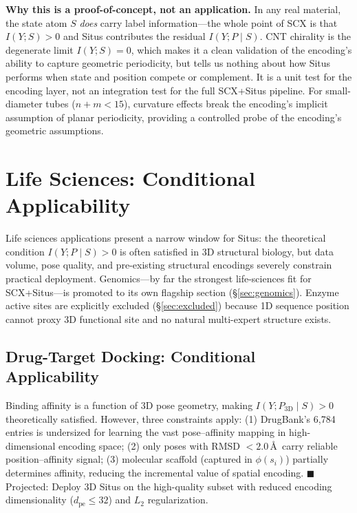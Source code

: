 \documentclass[12pt,a4paper]{article}
\begin{document}
\textbf{Why this is a proof-of-concept, not an application.} In any real material, the state atom $S$ \emph{does} carry label information---the whole point of SCX is that $I(Y;S) > 0$ and Situs contributes the residual $I(Y;P \mid S)$. CNT chirality is the degenerate limit $I(Y;S) = 0$, which makes it a clean validation of the encoding's ability to capture geometric periodicity, but tells us nothing about how Situs performs when state and position compete or complement. It is a unit test for the encoding layer, not an integration test for the full SCX+Situs pipeline. For small-diameter tubes ($n+m < 15$), curvature effects break the encoding's implicit assumption of planar periodicity, providing a controlled probe of the encoding's geometric assumptions.

\section{Life Sciences: Conditional Applicability}
\label{sec:lifesci}

Life sciences applications present a narrow window for Situs: the theoretical condition $I(Y;P \mid S) > 0$ is often satisfied in 3D structural biology, but data volume, pose quality, and pre-existing structural encodings severely constrain practical deployment. Genomics---by far the strongest life-sciences fit for SCX+Situs---is promoted to its own flagship section (\S\ref{sec:genomics}). Enzyme active sites are explicitly excluded (\S\ref{sec:excluded}) because 1D sequence position cannot proxy 3D functional site and no natural multi-expert structure exists.

\subsection{Drug-Target Docking: Conditional Applicability}

Binding affinity is a function of 3D pose geometry, making $I(Y; P_{\text{3D}} \mid S) > 0$ theoretically satisfied. However, three constraints apply: (1) DrugBank's 6,784 entries is undersized for learning the vast pose--affinity mapping in high-dimensional encoding space; (2) only poses with RMSD $< 2.0$\,\AA\ carry reliable position--affinity signal; (3) molecular scaffold (captured in $\phi(s_i)$) partially determines affinity, reducing the incremental value of spatial encoding. \textcolor{projected}{$\blacksquare$ Projected}: Deploy 3D Situs on the high-quality subset with reduced encoding dimensionality ($d_{\text{pe}} \leq 32$) and $L_2$ regularization.
\end{document}
